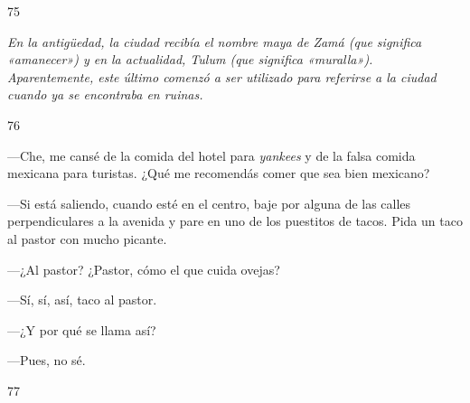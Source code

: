 \documentclass[12pt,twoside,openright,a5paper]{book}
\begin{document}
\vspace{0.5cm}

\hrulefill \hspace{0.1cm}\decofourleft\hspace{0.2cm} 75 \hspace{0.2cm}\decofourright \hspace{0.1cm}\hrulefill

\nopagebreak

\vspace{0.5cm}

\nopagebreak

\emph{
En la antigüedad, la ciudad recibía el nombre maya de \emph{Zamá} (que significa «amanecer») y
en la actualidad, \emph{Tulum}
(que significa «muralla»). Aparentemente, este último comenzó a ser utilizado
para referirse a la ciudad cuando
ya se encontraba en ruinas.}

\vspace{0.5cm}

\hrulefill \hspace{0.1cm}\decofourleft\hspace{0.2cm} 76 \hspace{0.2cm}\decofourright \hspace{0.1cm}\hrulefill

\nopagebreak

\vspace{0.5cm}

\nopagebreak

---Che, me cansé de la comida del hotel para \emph{yankees} y de la falsa comida
mexicana para turistas. ¿Qué me recomendás comer que sea bien mexicano?

---Si está saliendo, cuando esté en el centro, baje por alguna de las calles
perpendiculares a la avenida y pare en uno de los puestitos de tacos. Pida
un taco al pastor con mucho picante.

---¿Al pastor? ¿Pastor, cómo el que cuida ovejas?

---Sí, sí, así, taco al pastor.

---¿Y por qué se llama así?

---Pues, no sé.

\vspace{0.5cm}

\hrulefill \hspace{0.1cm}\decofourleft\hspace{0.2cm} 77 \hspace{0.2cm}\decofourright \hspace{0.1cm}\hrulefill
\end{document}
